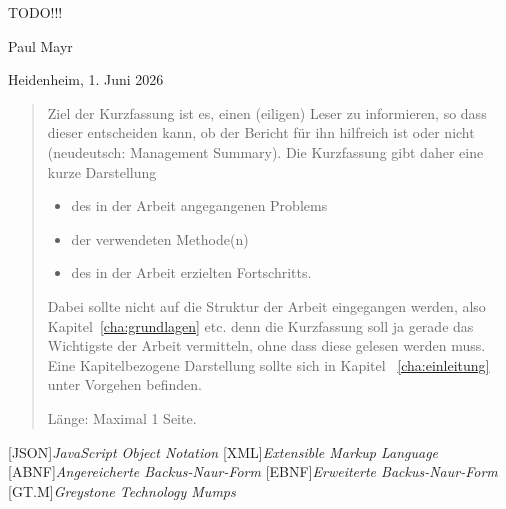 \documentclass[oneside]{ausarbeitung}
\begin{document}
TODO!!!



\vspace{3cm}

Paul Mayr

\vspace{1cm}

Heidenheim, 1. Juni 2026


\begin{abstract}
  Ziel der Kurzfassung ist es, einen (eiligen) Leser zu informieren, so
  dass dieser entscheiden kann, ob der Bericht für ihn hilfreich ist oder
  nicht (neudeutsch: Management Summary). Die Kurzfassung gibt daher eine
  kurze Darstellung

  \begin{itemize}
    \item des in der Arbeit angegangenen Problems
    \item der verwendeten Methode(n)
    \item des in der Arbeit erzielten Fortschritts.
  \end{itemize}

  Dabei sollte nicht auf die Struktur der Arbeit eingegangen werden, also
  Kapitel~\ref{cha:grundlagen} etc. denn die Kurzfassung soll ja gerade
  das Wichtigste der Arbeit vermitteln, ohne dass diese gelesen werden muss.
  Eine Kapitelbezogene Darstellung sollte sich in Kapitel~%
  \ref{cha:einleitung} unter Vorgehen befinden.

  Länge: Maximal 1 Seite.
\end{abstract}
\cleardoublepage
\tableofcontents

\listoffigures



\listofabbreviations
\begin{acronym}[JSON]  %

[JSON]{\textit{JavaScript Object Notation}}
[XML]{\textit{Extensible Markup Language}}
[ABNF]{\textit{Angereicherte Backus-Naur-Form}}
[EBNF]{\textit{Erweiterte Backus-Naur-Form}}
[GT.M]{\textit{Greystone Technology Mumps}}
\end{acronym}
\end{document}
